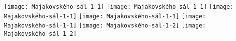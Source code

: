\documentclass[a3paper]{article}
\begin{document}
\flushright \texttt{[image: Majakovského-sál-1-1]}
\flushright \texttt{[image: Majakovského-sál-1-1]}
\flushright \texttt{[image: Majakovského-sál-1-1]}
\flushright \texttt{[image: Majakovského-sál-1-1]}
\flushright \texttt{[image: Majakovského-sál-1-1]}
\flushleft \texttt{[image: Majakovského-sál-1-2]}
\flushleft \texttt{[image: Majakovského-sál-1-2]}
\end{document}

